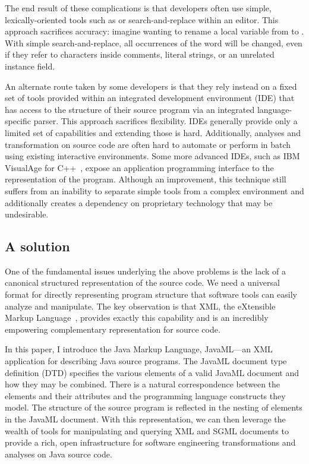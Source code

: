 \documentclass{article}
\begin{document}
\begin{multicols}{2}
The end result of these complications is that developers often use
simple, lexically-oriented tools such as  or
search-and-replace within an editor.  This approach sacrifices accuracy:
imagine wanting to rename a local variable from  to
.  With simple search-and-replace, all occurrences of
the word will be changed, even if they refer to characters inside
comments, literal strings, or an unrelated instance field.

An alternate route taken by some developers is that they rely instead on
a fixed set of tools provided within an integrated development
environment (IDE) that has access to the structure of their source
program via an integrated language-specific parser.  This approach
sacrifices flexibility.  IDEs generally provide only a limited set of
capabilities and extending those is hard.  Additionally, analyses and
transformation on source code are often hard to automate or perform in
batch using existing interactive environments.  Some more advanced IDEs,
such as IBM VisualAge for C++~\cite{Soroker97}, expose an application
programming interface to the representation of the program.  Although an
improvement, this technique still suffers from an inability to separate
simple tools from a complex environment and additionally creates a
dependency on proprietary technology that may be undesirable.

\subsection{A solution}

One of the fundamental issues underlying the above problems is the
lack of a canonical structured representation of the source code.  We
need a universal format for directly representing program structure that
software tools can easily analyze and manipulate.  The key observation
is that XML, the eXtensible Markup Language~\cite{XML}, provides exactly
this capability and is an incredibly empowering complementary
representation for source code.

In this paper, I introduce the Java Markup Language, JavaML---an XML
application for describing Java source programs.  The JavaML document
type definition (DTD) specifies the various elements of a valid JavaML
document and how they may be combined.  There is a natural
correspondence between the elements and their attributes and the
programming language constructs they model.  The structure of the source
program is reflected in the nesting of elements in the JavaML document.
With this representation, we can then leverage the wealth of tools for
manipulating and querying XML and SGML documents to provide a rich, open
infrastructure for software engineering transformations and analyses on
Java source code.


\end{multicols}
\end{document}
